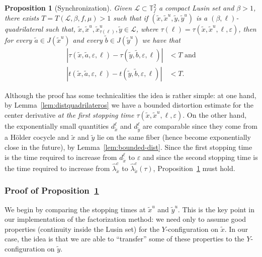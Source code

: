 \documentclass[a4paper,11pt,reqno]{amsart}
\newcommand{\TTf}{{\mathbb{T}_f^2}}
\newcommand{\cL}{{\mathcal L}}
\newcommand{\eps}{\varepsilon}
\newcommand{\tix}{\tilde{x}}
\newcommand{\ta}{\tilde{a}}
\newcommand{\tb}{\tilde{b}}
\newtheorem{proposition}{Proposition}
\theoremstyle{definition}
\begin{document}
\begin{proposition}[Synchronization]
    \label{prop:sync}
Given $\cL\subset\TTf$ a compact Lusin set and $\beta>1$, there exists $T=T(\cL,\beta,f,\mu)>1$ such that if $(\tix,\tix^u,\tilde{y},\tilde{y}^u)$ is a $(\beta,\ell)$-quadrilateral such that, $\tix,\tix^u,\tix^u_{\tau(\ell)},\tilde{y}\in\cL$, where $\tau(\ell)=\tau(\tix,\tix^u,\ell,\eps)$, then for every $\ta\in J(\tix^u)$ and every $\tb\in J(\tilde{y}^u)$ we have that 
\begin{align}
	\left|\tau(\tix,\ta,\eps,\ell)-\tau(\tilde{y},\tb,\eps,\ell)\right|&<T\nonumber \mbox{ and}\\
	\left|t(\tix,\ta,\eps,\ell)-t(\tilde{y},\tb,\eps,\ell)\right|&<T\nonumber.
\end{align}	
\end{proposition}

Although the proof has some technicalities the idea is rather simple: at one hand, by Lemma~\ref{lem:distquadrilateros} we have a bounded distortion estimate for the center derivative \emph{at the first stopping time $\tau(\tix,\tix^u,\ell,\eps)$}. On the other hand, the exponentially small quantities $d^{\ell}_{\tix}$ and $d^{\ell}_{\tilde{y}}$ are comparable since they come from a Hölder cocycle and $\tix$ and $\tilde{y}$ lie on the same fiber (hence become exponentially close in the future), by Lemma~\ref{lem:bounded-dist}. Since the first stopping time is the time required to increase from $d^{\ell}_{\tix}$ to $\eps$ and since the second stopping time is the time required to increase from $\hat{\lambda}^c_{\tix}$ to $\hat{\lambda}^c_{\tix}(\tau)$, Proposition~\ref{prop:sync} must hold.    

\subsubsection{Proof of Proposition~\ref{prop:sync}}
We begin by comparing the stopping times at $\tix^u$ and $\tilde{y}^u$. This is the key point in our implementation of the factorization method: we need only to assume good properties (continuity inside the Lusin set) for the $Y$-configuration on $\tix$. In our case, the idea is that we are able to ``transfer'' some of these properties to the $Y$-configuration on $\tilde{y}$.  
\end{document}
